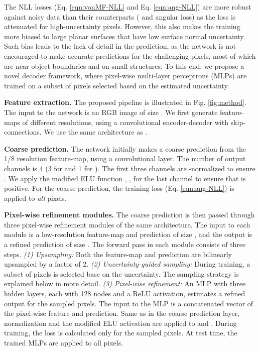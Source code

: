 \documentclass[10pt,twocolumn,letterpaper]{article}
\begin{document}
The NLL losses (Eq. \ref{eqn:vonMF-NLL} and Eq. \ref{eqn:ang-NLL}) are more robust against noisy data than their counterparts ( and angular loss) as the loss is attenuated for high-uncertainty pixels. However, this also makes the training more biased to large planar surfaces that have low surface normal uncertainty. Such bias leads to the lack of detail in the prediction, as the network is not encouraged to make accurate predictions for the challenging pixels, most of which are near object boundaries and on small structures. To this end, we propose a novel decoder framework, where pixel-wise multi-layer perceptrons (MLPs) are trained on a subset of pixels selected based on the estimated uncertainty.

\noindent
\textbf{Feature extraction.} The proposed pipeline is illustrated in Fig. \ref{fig:method}. The input to the network is an RGB image of size . We first generate feature-maps of different resolutions, using a convolutional encoder-decoder with skip-connections. We use the same architecture as \cite{adabins}.

\noindent
\textbf{Coarse prediction.} The network initially makes a coarse prediction from the 1/8 resolution feature-map, using a  convolutional layer. The number of output channels is 4 (3 for  and 1 for ). The first three channels are -normalized to ensure . We apply the modified ELU function \cite{other-ELU}, , for the last channel to ensure that  is positive. For the coarse prediction, the training loss (Eq. \ref{eqn:ang-NLL}) is applied to \textit{all} pixels.

\noindent
\textbf{Pixel-wise refinement modules.} The coarse prediction is then passed through three pixel-wise refinement modules of the same architecture. The input to each module is a low-resolution feature-map and prediction of size , and the output is a refined prediction of size . The forward pass in each module consists of three steps. \textit{(1) Upsampling:} Both the feature-map and prediction are bilinearly upsampled by a factor of 2. \textit{(2) Uncertainty-guided sampling:} During training, a subset of pixels is selected base on the uncertainty. The sampling strategy is explained below in more detail. \textit{(3) Pixel-wise refinement:} An MLP with three hidden layers, each with 128 nodes and a ReLU \cite{other-RELU} activation, estimates a refined output for the sampled pixels. The input to the MLP is a concatenated vector of the pixel-wise feature and prediction. Same as in the coarse prediction layer,  normalization and the modified ELU activation are applied to  and . During training, the loss is calculated only for the sampled pixels. At test time, the trained MLPs are applied to all pixels.
\end{document}
